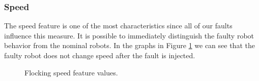 \documentclass[../../Thesis.tex]{subfiles}
\begin{document}
			\subsubsection{Speed}
				The speed feature is one of the most characteristics since all of our faults influence this measure. It is possible to immediately distinguish the faulty robot behavior from the nominal robots. In the graphs in Figure \ref{fig:flocking_speed} we can see that the faulty robot does not change speed after the fault is injected. 
				\begin{figure}
					\centering
					\quad
					\caption{Flocking speed feature values.}
					\label{fig:flocking_speed}
				\end{figure}
			
\end{document}
